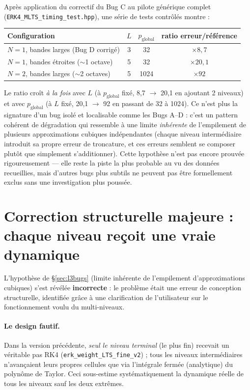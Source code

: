 \documentclass[11pt]{article}
\newcommand{\code}[1]{\texttt{#1}}
\begin{document}
Après application du correctif du Bug C au pilote générique complet
(\code{ERK4\_MLTS\_timing\_test.hpp}), une série de tests contrôlés
montre :
\begin{center}
\begin{tabular}{lccc}
\toprule
Configuration & $L$ & $p_{\text{global}}$ & ratio erreur/référence \\
\midrule
$N=1$, bandes larges (Bug D corrigé) & 3 & 32 & $\times 8{,}7$ \\
$N=1$, bandes étroites ($\sim$1 octave) & 5 & 32 & $\times 20{,}1$ \\
$N=2$, bandes larges ($\sim$2 octaves) & 5 & 1024 & $\times 92$ \\
\bottomrule
\end{tabular}
\end{center}

Le ratio croît \emph{à la fois} avec $L$ (à $p_{\text{global}}$ fixé, 8,7
$\to$ 20,1 en ajoutant 2 niveaux) et avec $p_{\text{global}}$ (à $L$ fixé,
20,1 $\to$ 92 en passant de 32 à 1024). Ce n'est plus la signature d'un
bug isolé et localisable comme les Bugs A--D : c'est un pattern cohérent
de dégradation qui ressemble à une limite \emph{inhérente} de
l'empilement de plusieurs approximations cubiques indépendantes (chaque
niveau intermédiaire introduit sa propre erreur de troncature, et ces
erreurs semblent se composer plutôt que simplement s'additionner). Cette
hypothèse n'est pas encore prouvée rigoureusement --- elle reste la
piste la plus probable au vu des données recueillies, mais d'autres bugs
plus subtils ne peuvent pas être formellement exclus sans une
investigation plus poussée.

\section{Correction structurelle majeure : chaque niveau reçoit une vraie dynamique}
\label{sec:realrk4}

L'hypothèse de \S\ref{sec:l3bugs} (limite inhérente de l'empilement
d'approximations cubiques) s'est révélée \textbf{incorrecte} : le
problème était une erreur de conception structurelle, identifiée grâce à
une clarification de l'utilisateur sur le fonctionnement voulu du
multi-niveaux.

\paragraph{Le design fautif.} Dans la version précédente, \emph{seul le
niveau terminal} (le plus fin) recevait un véritable pas RK4
(\code{erk\_weight\_LTS\_fine\_v2}) ; tous les niveaux intermédiaires
n'avançaient leurs propres cellules que via l'intégrale fermée
(analytique) du polynôme de Taylor. Ceci sous-estime systématiquement la
dynamique réelle de tous les niveaux sauf les deux extrêmes.
\end{document}
